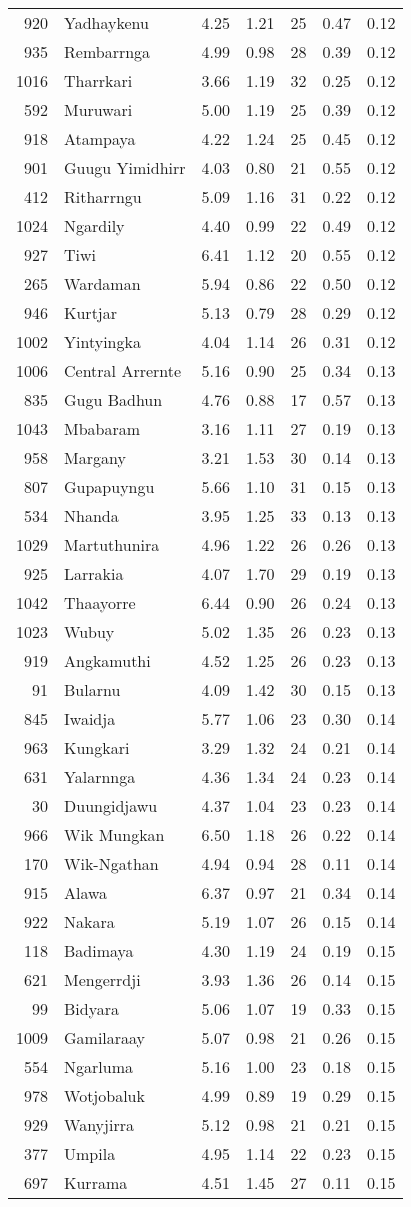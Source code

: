\begin{longtable}[]{@{}rlrrrrr@{}}
920 & Yadhaykenu & 4.25 & 1.21 & 25 & 0.47 & 0.12\tabularnewline
935 & Rembarrnga & 4.99 & 0.98 & 28 & 0.39 & 0.12\tabularnewline
1016 & Tharrkari & 3.66 & 1.19 & 32 & 0.25 & 0.12\tabularnewline
592 & Muruwari & 5.00 & 1.19 & 25 & 0.39 & 0.12\tabularnewline
918 & Atampaya & 4.22 & 1.24 & 25 & 0.45 & 0.12\tabularnewline
901 & Guugu Yimidhirr & 4.03 & 0.80 & 21 & 0.55 & 0.12\tabularnewline
412 & Ritharrngu & 5.09 & 1.16 & 31 & 0.22 & 0.12\tabularnewline
1024 & Ngardily & 4.40 & 0.99 & 22 & 0.49 & 0.12\tabularnewline
927 & Tiwi & 6.41 & 1.12 & 20 & 0.55 & 0.12\tabularnewline
265 & Wardaman & 5.94 & 0.86 & 22 & 0.50 & 0.12\tabularnewline
946 & Kurtjar & 5.13 & 0.79 & 28 & 0.29 & 0.12\tabularnewline
1002 & Yintyingka & 4.04 & 1.14 & 26 & 0.31 & 0.12\tabularnewline
1006 & Central Arrernte & 5.16 & 0.90 & 25 & 0.34 & 0.13\tabularnewline
835 & Gugu Badhun & 4.76 & 0.88 & 17 & 0.57 & 0.13\tabularnewline
1043 & Mbabaram & 3.16 & 1.11 & 27 & 0.19 & 0.13\tabularnewline
958 & Margany & 3.21 & 1.53 & 30 & 0.14 & 0.13\tabularnewline
807 & Gupapuyngu & 5.66 & 1.10 & 31 & 0.15 & 0.13\tabularnewline
534 & Nhanda & 3.95 & 1.25 & 33 & 0.13 & 0.13\tabularnewline
1029 & Martuthunira & 4.96 & 1.22 & 26 & 0.26 & 0.13\tabularnewline
925 & Larrakia & 4.07 & 1.70 & 29 & 0.19 & 0.13\tabularnewline
1042 & Thaayorre & 6.44 & 0.90 & 26 & 0.24 & 0.13\tabularnewline
1023 & Wubuy & 5.02 & 1.35 & 26 & 0.23 & 0.13\tabularnewline
919 & Angkamuthi & 4.52 & 1.25 & 26 & 0.23 & 0.13\tabularnewline
91 & Bularnu & 4.09 & 1.42 & 30 & 0.15 & 0.13\tabularnewline
845 & Iwaidja & 5.77 & 1.06 & 23 & 0.30 & 0.14\tabularnewline
963 & Kungkari & 3.29 & 1.32 & 24 & 0.21 & 0.14\tabularnewline
631 & Yalarnnga & 4.36 & 1.34 & 24 & 0.23 & 0.14\tabularnewline
30 & Duungidjawu & 4.37 & 1.04 & 23 & 0.23 & 0.14\tabularnewline
966 & Wik Mungkan & 6.50 & 1.18 & 26 & 0.22 & 0.14\tabularnewline
170 & Wik-Ngathan & 4.94 & 0.94 & 28 & 0.11 & 0.14\tabularnewline
915 & Alawa & 6.37 & 0.97 & 21 & 0.34 & 0.14\tabularnewline
922 & Nakara & 5.19 & 1.07 & 26 & 0.15 & 0.14\tabularnewline
118 & Badimaya & 4.30 & 1.19 & 24 & 0.19 & 0.15\tabularnewline
621 & Mengerrdji & 3.93 & 1.36 & 26 & 0.14 & 0.15\tabularnewline
99 & Bidyara & 5.06 & 1.07 & 19 & 0.33 & 0.15\tabularnewline
1009 & Gamilaraay & 5.07 & 0.98 & 21 & 0.26 & 0.15\tabularnewline
554 & Ngarluma & 5.16 & 1.00 & 23 & 0.18 & 0.15\tabularnewline
978 & Wotjobaluk & 4.99 & 0.89 & 19 & 0.29 & 0.15\tabularnewline
929 & Wanyjirra & 5.12 & 0.98 & 21 & 0.21 & 0.15\tabularnewline
377 & Umpila & 4.95 & 1.14 & 22 & 0.23 & 0.15\tabularnewline
697 & Kurrama & 4.51 & 1.45 & 27 & 0.11 & 0.15\tabularnewline

\end{longtable}
